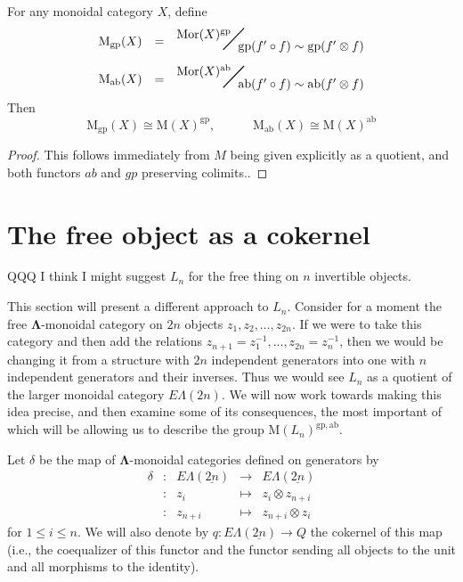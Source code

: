 \documentclass{amsbook} %
\newcommand{\ML}{\mathbf{\Lambda}}
\newcommand{\bigquotient}[2]{ \raisebox{0.75\height}{$#1$} \mkern-12mu\scalebox{2}{$\diagup$}\mkern-10mu \raisebox{-0.5\height}{$#2$} }
\newcommand{\EL}{E\Lambda}
\numberwithin{section}{chapter}
\begin{document}
\begin{lem}\label{Morder} For any monoidal category $X$, define
\[ \begin{array}{rll} 
			\mathrm{M}_{\mathrm{gp}}(X) & = & \bigquotient{\mathrm{Mor}(X)^{\mathrm{gp}}}{\mathrm{gp}(f' \circ f) \sim \mathrm{gp}(f' \otimes f)} \\[\bigskipamount]
			\mathrm{M}_{\mathrm{ab}}(X) & = & \bigquotient{\mathrm{Mor}(X)^{\mathrm{ab}}}{\mathrm{ab}(f' \circ f) \sim \mathrm{ab}(f' \otimes f)}
		\end{array}
\] 
Then
\[ \mathrm{M}_{\mathrm{gp}}(X) \cong \mathrm{M}(X)^{\mathrm{gp}}, \quad \quad \quad \mathrm{M}_{\mathrm{ab}}(X) \cong \mathrm{M}(X)^{\mathrm{ab}} \]
\end{lem}
\begin{proof}
This follows immediately from $M$ being given explicitly as a quotient, and both functors $ab$ and $gp$ preserving colimits..
\end{proof}



\section{The free object as a cokernel}
\label{colimalgebra} 

QQQ I think I might suggest $L_n$ for the free thing on $n$ invertible objects.


This section will present a different approach to $L_n$. Consider for a moment the free $\ML$-monoidal category on $2n$ objects $z_1, z_2, \ldots, z_{2n}$. If we were to take this category and then add the relations $z_{n+1} = z_1^{-1}, ..., z_{2n} = z_n^{-1}$, then we would be changing it from a structure with $2n$ independent generators into one with $n$ independent generators and their inverses. Thus we would see $L_n$ as a quotient of the larger monoidal category $\EL(2n)$. We will now work towards making this idea precise, and then examine some of its consequences, the most important of which will be allowing us to describe the group $\mathrm{M}(L_n)^{\mathrm{gp},\mathrm{ab}}$.





\begin{Defi}\label{qdef} Let $\delta$ be the map of $\ML$-monoidal categories defined on generators by
\[ \begin{array}{rlrlll}
			\delta & : & \EL(\underline{2n}) & \to & \EL(\underline{2n}) \\
			& : & z_{i} & \mapsto & z_i \otimes z_{n+i} \\
			& : & z_{n+i} & \mapsto & z_{n+i} \otimes z_i			
		\end{array}
\]
for $1 \le i \le n$. We will also denote by $q: \EL(\underline{2n}) \to Q$ the cokernel of this map (i.e., the coequalizer of this functor and the functor sending all objects to the unit and all morphisms to the identity).  
\end{Defi}
\end{document}
